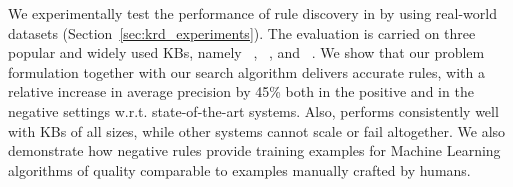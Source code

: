 We experimentally test the performance of rule discovery in \krd by using real-world datasets (Section~\ref{sec:krd_experiments}). The evaluation is carried on  three popular and widely used KBs, namely \dbpedia~\cite{bizer2009dbpedia}, \yago~\cite{suchanek2007yago}, and \wikidata~\cite{vrandevcic2014wikidata}. 
We show that our problem formulation together with our 
search algorithm delivers accurate rules, 
with a relative increase in average precision by 45\% both in the positive and in the negative settings w.r.t. state-of-the-art systems.
Also, \krd performs consistently well with KBs of all sizes, while other systems cannot scale or fail altogether. %
We also 
demonstrate how negative rules %
provide training examples for Machine Learning algorithms of quality comparable to examples manually crafted by humans.



